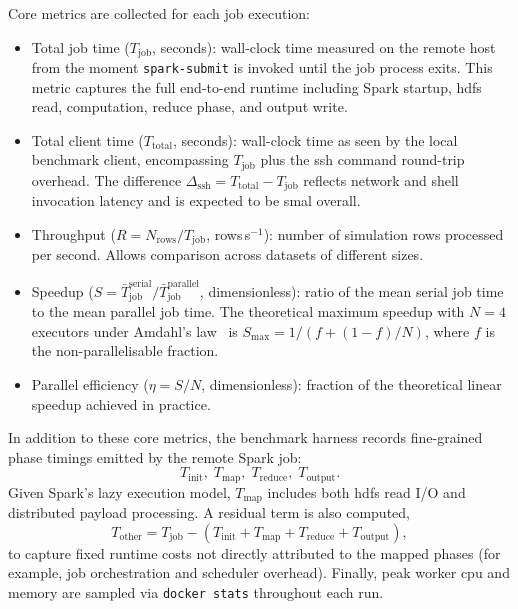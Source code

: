 Core metrics are collected for each job execution:

\begin{itemize}
    \item Total job time ($T_{\text{job}}$, seconds): wall-clock time measured
          on the remote host from the moment \texttt{spark-submit} is invoked until the
          job process exits.  This metric captures the full end-to-end runtime including
          Spark startup, \gls{hdfs} read, computation, reduce phase, and output write.

    \item Total client time ($T_{\text{total}}$, seconds): wall-clock time as
          seen by the local benchmark client, encompassing $T_{\text{job}}$ plus the
          \gls{ssh} command round-trip overhead.  The difference
          $\Delta_{\text{ssh}} = T_{\text{total}} - T_{\text{job}}$ reflects network
          and shell invocation latency and is expected to be smal overall.

    \item Throughput ($R = N_{\text{rows}} / T_{\text{job}}$, rows\,s$^{-1}$):
          number of simulation rows processed per second.  Allows comparison across
          datasets of different sizes.

    \item Speedup ($S = \bar{T}_{\text{job}}^{\text{serial}} /
          \bar{T}_{\text{job}}^{\text{parallel}}$, dimensionless): ratio of the mean
          serial job time to the mean parallel job time.  The theoretical maximum speedup
          with $N = 4$ executors under Amdahl's law~\parencite{amdahl1967} is
          $S_{\max} = 1 / (f + (1-f)/N)$, where $f$ is the non-parallelisable fraction.

    \item Parallel efficiency ($\eta = S / N$, dimensionless):
          fraction of the theoretical linear speedup achieved in practice.
\end{itemize}

In addition to these core metrics, the benchmark harness records fine-grained phase
timings emitted by the remote Spark job:
\[
T_{\text{init}},\; T_{\text{map}},\; T_{\text{reduce}},\; T_{\text{output}}.
\]
Given Spark's lazy execution model, \(T_{\text{map}}\) includes both \gls{hdfs} read
I/O and distributed payload processing.  A residual term is also computed,
\[
T_{\text{other}} = T_{\text{job}} -
\left(T_{\text{init}} + T_{\text{map}} + T_{\text{reduce}} + T_{\text{output}}\right),
\]
to capture fixed runtime costs not directly attributed to the mapped phases
(for example, job orchestration and scheduler overhead).  Finally, peak worker
\gls{cpu} and memory are sampled via \texttt{docker stats} throughout each run.


